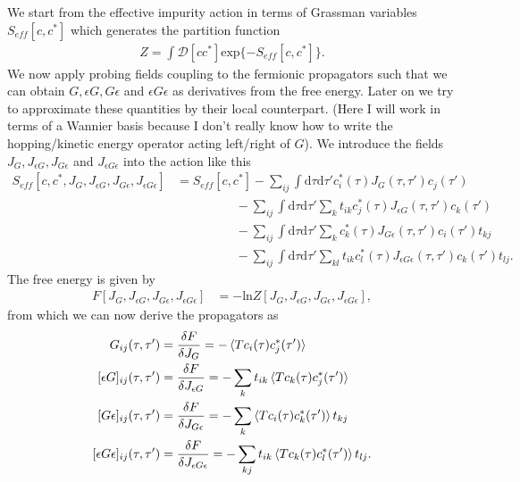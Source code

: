 \documentclass[12pt,a4paper]{scrartcl}
\numberwithin{equation}{section}
\begin{document}
 We start from the effective impurity action in terms of Grassman variables
 $S_{eff}[c,c^*]$ which generates the partition function
 \begin{align}
  Z = \int \mathcal{D}[cc^*] \mathrm{exp}\{-S_{eff}[c,c^*] \}.
 \end{align}
We now apply probing fields coupling to the fermionic propagators such that we can obtain $G, \epsilon G, G\epsilon$
and $\epsilon G \epsilon$ as derivatives from the free energy. Later on we try to approximate these quantities by their local 
counterpart. (Here I will work in terms of a Wannier basis because I don't really know how to write the hopping/kinetic energy
operator acting left/right of $G$). We introduce the fields $J_{G},J_{\epsilon G}, J_{G \epsilon}$ and $J_{\epsilon G \epsilon}$
into the action like this
\begin{align}
 S_{eff}[c,c^*,J_{G},J_{\epsilon G}, J_{G \epsilon},J_{\epsilon G \epsilon}]
 &= S_{eff}[c,c^*] 
  - \sum_{ij}\int\mathrm{d}\tau\mathrm{d}\tau' c^*_i(\tau) J_{G}(\tau,\tau') c_j(\tau') \nonumber \\
  &\hspace{2cm} - \sum_{ij}\int\mathrm{d}\tau\mathrm{d}\tau' \sum_{k} t_{ik} c^*_j(\tau) J_{\epsilon G}(\tau,\tau') c_k(\tau')\nonumber \\
  &\hspace{2cm} - \sum_{ij}\int\mathrm{d}\tau\mathrm{d}\tau' \sum_{k} c^*_k(\tau) J_{G \epsilon}(\tau,\tau') c_i(\tau') t_{kj}\nonumber \\
  &\hspace{2cm} - \sum_{ij}\int\mathrm{d}\tau\mathrm{d}\tau' \sum_{kl} t_{ik}c^*_l(\tau) J_{\epsilon G \epsilon}(\tau,\tau') c_k(\tau') t_{lj}.
\end{align}
The free energy is given by
\begin{align}
 F[J_{G},J_{\epsilon G}, J_{G \epsilon},J_{\epsilon G \epsilon}]
 &= -\mathrm{ln} Z[J_{G},J_{\epsilon G}, J_{G \epsilon},J_{\epsilon G \epsilon}],
\end{align}
from which we can now derive the propagators as 
\begin{align}
 G_{ij}(\tau,\tau') &=  \frac{\delta F}{\delta J_{G}} = -\braket{T  c_i(\tau) c^*_j(\tau') } \\
 [\epsilon G]_{ij}(\tau,\tau') &= \frac{\delta F}{\delta J_{ \epsilon G}} = - \sum_{k} t_{ik} \braket{T  c_k(\tau)c^*_j(\tau') } \\
 [G \epsilon]_{ij}(\tau,\tau') &= \frac{\delta F}{\delta J_{G \epsilon}} = - \sum_{k}  \braket{T  c_i(\tau)c^*_k(\tau') }t_{kj} \\
 [\epsilon G \epsilon]_{ij}(\tau,\tau') &= \frac{\delta F}{\delta J_{\epsilon G \epsilon}} = - \sum_{kj} t_{ik} \braket{T  c_k(\tau)c^*_l(\tau') } t_{lj} .
\end{align}
\end{document}
